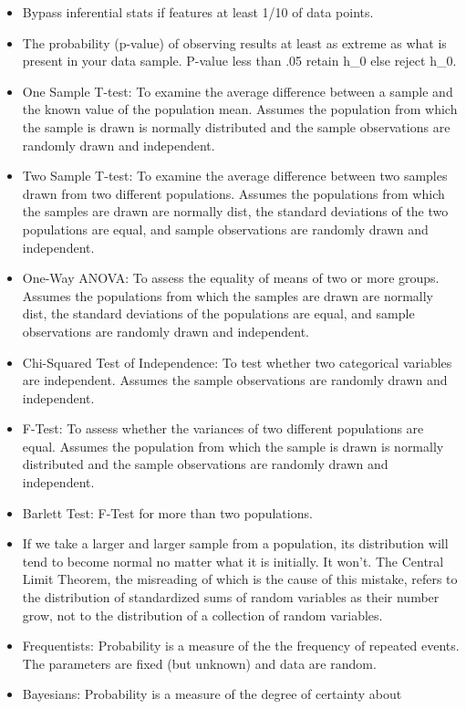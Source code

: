 \documentclass[]{book}
\begin{document}
\begin{itemize}
\item
  Bypass inferential stats if features at least 1/10 of data points.
\item
  The probability (p-value) of observing results at least as extreme as
  what is present in your data sample. P-value less than .05 retain h\_0
  else reject h\_0.
\item
  One Sample T-test: To examine the average difference between a sample
  and the known value of the population mean. Assumes the population
  from which the sample is drawn is normally distributed and the sample
  observations are randomly drawn and independent.
\item
  Two Sample T-test: To examine the average difference between two
  samples drawn from two different populations. Assumes the populations
  from which the samples are drawn are normally dist, the standard
  deviations of the two populations are equal, and sample observations
  are randomly drawn and independent.
\item
  One-Way ANOVA: To assess the equality of means of two or more groups.
  Assumes the populations from which the samples are drawn are normally
  dist, the standard deviations of the populations are equal, and sample
  observations are randomly drawn and independent.
\item
  Chi-Squared Test of Independence: To test whether two categorical
  variables are independent. Assumes the sample observations are
  randomly drawn and independent.
\item
  F-Test: To assess whether the variances of two different populations
  are equal. Assumes the population from which the sample is drawn is
  normally distributed and the sample observations are randomly drawn
  and independent.
\item
  Barlett Test: F-Test for more than two populations.
\item
  If we take a larger and larger sample from a population, its
  distribution will tend to become normal no matter what it is
  initially. It won't. The Central Limit Theorem, the misreading of
  which is the cause of this mistake, refers to the distribution of
  standardized sums of random variables as their number grow, not to the
  distribution of a collection of random variables.
\item
  Frequentists: Probability is a measure of the the frequency of
  repeated events. The parameters are fixed (but unknown) and data are
  random.
\item
  Bayesians: Probability is a measure of the degree of certainty about

\end{itemize}
\end{document}
